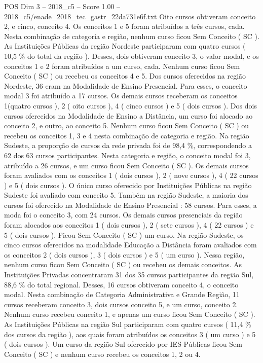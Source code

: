 \begin{textsample}{POS Dim 3 – 2018\_c5 – Score 1.00 – 2018\_c5/enade\_2018\_tec\_gastr\_22da731e6f.txt}
Oito cursos obtiveram conceito 2, e cinco, conceito 4.
Os conceitos 1 e 5 foram atribuídos a três cursos, cada.
Nesta combinação de categoria e região, nenhum curso ficou Sem Conceito ( SC ).
As Instituições Públicas da região Nordeste participaram com quatro cursos ( 10,5 \% do total da região ).
Desses, dois obtiveram conceito 3, o valor modal, e os conceitos 1 e 2 foram atribuídos a um curso, cada.
Nenhum curso ficou Sem Conceito ( SC ) ou recebeu os conceitos 4 e 5.
Dos cursos oferecidos na região Nordeste, 36 eram na Modalidade de Ensino Presencial.
Para esses, o conceito modal 3 foi atribuído a 17 cursos.
Os demais cursos receberam os conceitos 1(quatro cursos ), 2 ( oito cursos ), 4 ( cinco cursos ) e 5 ( dois cursos ).
Dos dois cursos oferecidos na Modalidade de Ensino a Distância, um curso foi alocado ao conceito 2, e outro, ao conceito 5.
Nenhum curso ficou Sem Conceito ( SC ) ou recebeu os conceitos 1, 3 e 4 nesta combinação de categoria e região.
Na região Sudeste, a proporção de cursos da rede privada foi de 98,4 \%, correspondendo a 62 dos 63 cursos participantes.
Nesta categoria e região, o conceito modal foi 3, atribuído a 26 cursos, e um curso ficou Sem Conceito ( SC ).
Os demais cursos foram avaliados com os conceitos 1 ( dois cursos ), 2 ( nove cursos ), 4 ( 22 cursos ) e 5 ( dois cursos ).
O único curso oferecido por Instituições Públicas na região Sudeste foi avaliado com conceito 5.
Também na região Sudeste, a maioria dos cursos foi oferecido na Modalidade de Ensino Presencial : 58 cursos.
Para esses, a moda foi o conceito 3, com 24 cursos.
Os demais cursos presenciais da região foram alocados aos conceitos 1 ( dois cursos ), 2 ( sete cursos ), 4 ( 22 cursos ) e 5 ( dois cursos ).
Ficou Sem Conceito ( SC ) um curso.
Na região Sudeste, os cinco cursos oferecidos na modalidade Educação a Distância foram avaliados com os conceitos 2 ( dois cursos ), 3 ( dois cursos ) e 5 ( um curso ).
Nessa região, nenhum curso ficou Sem Conceito ( SC ) ou recebeu os demais conceitos.
As Instituições Privadas concentraram 31 dos 35 cursos participantes da região Sul, 88,6 \% do total regional.
Desses, 16 cursos obtiveram conceito 4, o conceito modal.
Nesta combinação de Categoria Administrativa e Grande Região, 11 cursos receberam conceito 3, dois cursos conceito 5, e um curso, conceito 2.
Nenhum curso recebeu conceito 1, e apenas um curso ficou Sem Conceito ( SC ).
As Instituições Públicas na região Sul participaram com quatro cursos ( 11,4 \% dos cursos da região ), aos quais foram atribuídos os conceitos 3 ( um curso ) e 5 ( dois cursos ).
Um curso da região Sul oferecido por IES Públicas ficou Sem Conceito ( SC ) e nenhum curso recebeu os conceitos 1, 2 ou 4.

\end{textsample}
